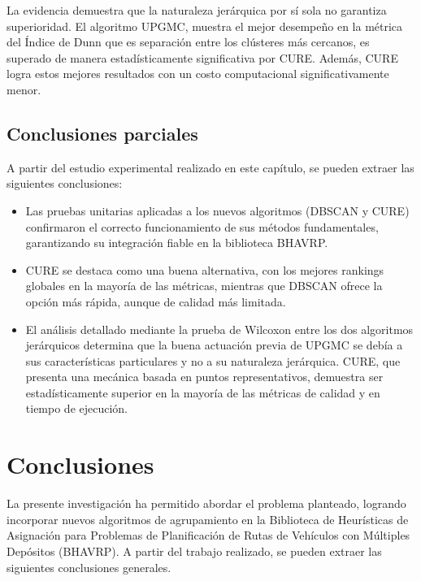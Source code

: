 La evidencia demuestra que la naturaleza jer\'arquica por s\'i sola no garantiza superioridad. El algoritmo UPGMC, muestra el mejor desempe\~no en la m\'etrica del \'Indice de Dunn que es separaci\'on entre los cl\'usteres m\'as cercanos, es superado de manera estad\'isticamente significativa por CURE. Adem\'as, CURE logra estos mejores resultados con un costo computacional significativamente menor.

\section{Conclusiones parciales}

A partir del estudio experimental realizado en este cap\'itulo, se pueden extraer las siguientes conclusiones:

\begin{itemize}
  \item Las pruebas unitarias aplicadas a los nuevos algoritmos (DBSCAN y CURE) confirmaron el correcto funcionamiento de sus m\'etodos fundamentales, garantizando su integraci\'on fiable en la biblioteca BHAVRP.
  \item CURE se destaca como una buena alternativa, con los mejores rankings globales en la mayor\'ia de las m\'etricas, mientras que DBSCAN ofrece la opci\'on m\'as r\'apida, aunque de calidad m\'as limitada.
  \item El an\'alisis detallado mediante la prueba de Wilcoxon entre los dos algoritmos jer\'arquicos determina que la buena actuaci\'on previa de UPGMC se deb\'ia a sus caracter\'isticas particulares y no a su naturaleza jer\'arquica. CURE, que presenta una mec\'anica basada en puntos representativos, demuestra ser estad\'isticamente superior en la mayor\'ia de las m\'etricas de calidad y en tiempo de ejecuci\'on.
\end{itemize}

\chapter*{Conclusiones}

La presente investigaci\'on ha permitido abordar el problema planteado, logrando incorporar nuevos algoritmos de agrupamiento en la Biblioteca de Heur\'isticas de Asignaci\'on para Problemas de Planificaci\'on de Rutas de Veh\'iculos con M\'ultiples Dep\'ositos (BHAVRP). A partir del trabajo realizado, se pueden extraer las siguientes conclusiones generales.

